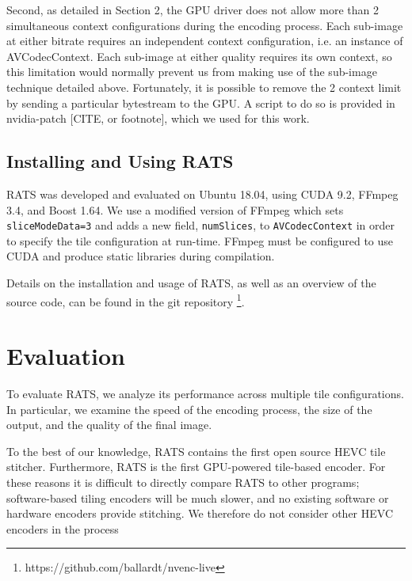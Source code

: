 Second, as detailed in Section 2, the GPU driver does not allow more than 2 simultaneous context configurations during the encoding process. Each sub-image at either bitrate requires an independent context configuration, i.e. an instance of AVCodecContext. Each sub-image at either quality requires its own context, so this limitation would normally prevent us from making use of the sub-image technique detailed above. Fortunately, it is possible to remove the 2 context limit by sending a particular bytestream to the GPU. A script to do so is provided in nvidia-patch [CITE, or footnote], which we used for this work.

\subsection{Installing and Using RATS}
RATS was developed and evaluated on Ubuntu 18.04, using CUDA 9.2, FFmpeg 3.4, and Boost 1.64. We use a modified version of FFmpeg which sets \texttt{sliceModeData=3} and adds a new field, \texttt{numSlices}, to \texttt{AVCodecContext} in order to specify the tile configuration at run-time. FFmpeg must be configured to use CUDA and produce static libraries during compilation.

Details on the installation and usage of RATS, as well as an overview of the source code, can be found in the git repository \footnote{https://github.com/ballardt/nvenc-live}. 

\section{Evaluation}
To evaluate RATS, we analyze its performance across multiple tile configurations. In particular, we examine the speed of the encoding process, the size of the output, and the quality of the final image. 

To the best of our knowledge, RATS contains the first open source HEVC tile stitcher. Furthermore, RATS is the first GPU-powered tile-based encoder. For these reasons it is difficult to directly compare RATS to other programs; software-based tiling encoders will be much slower, and no existing software or hardware encoders provide stitching. We therefore do not consider other HEVC encoders in the process


